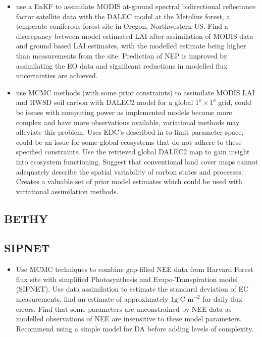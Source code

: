 \documentclass[12pt, a4paper]{article}
\begin{document}
\begin{itemize}
\item \citet{Quaife2008} use a EnKF to assimilate MODIS at-ground spectral bidirectional reflectance factor satellite data with the DALEC model at the Metolius forest, a temperate coniferous forest site in Oregon, Northwestern US. Find a discrepancy between model estimated LAI after assimilation of MODIS data and ground based LAI estimates, with the modelled estimate being higher than measurements from the site. Prediction of NEP is improved by assimilating the EO data and significant reductions in modelled flux uncertainties are achieved.    

\item \citet{bloom2016decadal} use MCMC methods (with some prior constraints) to assimilate MODIS LAI and HWSD soil carbon with DALEC2 model for a global \(1^o \times 1^o\) grid, could be issues with computing power as implemented models become more complex and have more observations available, variational methods may alleviate this problem. Uses EDC's described in \citet{Bloom2015} to limit parameter space, could be an issue for some global ecosystems that do not adhere to these specified constraints. Use the retrieved global DALEC2 map to gain insight into ecosystem functioning. Suggest that conventional land cover maps cannot adequately describe  the spatial variability of carbon states and processes. Creates a valuable set of prior model estimates which could be used with variational assimilation methods.

\end{itemize}


\subsection{BETHY}

\subsection{SIPNET}

\begin{itemize}

\item \citet{braswell2005estimating} Use MCMC techniques to combine gap-filled NEE data from Harvard Forest flux site with simplified Photosynthesis and Evapo-Transpiration model (SIPNET). Use data assimilation to estimate the standard deviation of EC measurements, find an estimate of approximately \(1 \text{g C m}^{-2}\) for daily flux errors. Find that some parameters are unconstrained by NEE data as modelled observations of NEE are insensitive to these model parameters. Recommend using a simple model for DA before adding levels of complexity.  

\end{itemize}
\end{document}

